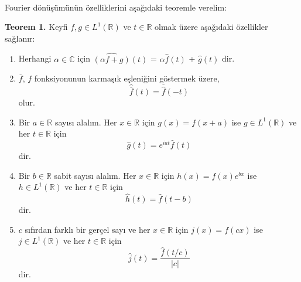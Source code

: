 \documentclass[a4paper, 10pt]{article}
\begin{document}
\paragraph{} Fourier dönüşümünün özelliklerini aşağıdaki teoremle verelim:

\textbf{Teorem 1.} Keyfi $f, g \in L^1(\mathbb{R})$ ve $t\in \mathbb{R}$ olmak üzere aşağıdaki özellikler sağlanır:

\begin{enumerate}
\item Herhangi $\alpha \in \mathbb{C}$ için $\widehat{(\alpha f+g)}(t)$ = $\alpha \widehat{f}(t)$ + $\widehat{g}(t)$ dir.
\item  $\overline{f}$, $f$ fonksiyonunun karmaşık eşleniğini göstermek üzere,
\[ \widehat{\overline{f}}(t) = \overline{\widehat{f}}(-t) \]
olur.
\item  Bir $a \in \mathbb{R}$  sayısı alalım. Her $x\in \mathbb{R}$  için $g(x)=f(x+a)$ ise $g\in L^1(\mathbb{R})$ ve her $t\in \mathbb{R}$ için 
\[ \widehat{g}(t) = e^{iat}\widehat{f}(t)\]
dir.
\item Bir $b\in \mathbb{R}$ sabit sayısı alalım. Her $x\in \mathbb{R}$ için $h(x)=f(x)e^{bx}$ ise $h\in L^1(\mathbb{R})$ ve her $t\in \mathbb{R}$ için
\[ \widehat{h}(t) = \widehat{f}(t-b) \]
dir.
\item $c$ sıfırdan farklı bir gerçel sayı ve her $x \in \mathbb{R}$ için $j(x)=f(cx)$ ise $j\in L^1(\mathbb{R})$ ve her $t\in \mathbb{R}$ için
\[ \widehat{j}(t)=\frac{\widehat{f}(t/c)}{\left |  c \right |} \] dir.

\end{enumerate}
\end{document}
